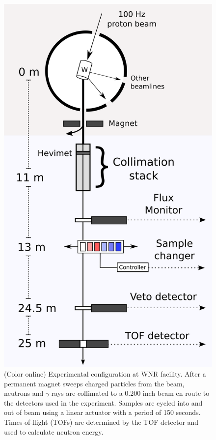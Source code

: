 \documentclass[twocolumn,secnumarabic,amssymb, nobibnotes, aps, prl,
superscriptaddress, nobalancelastpage]{revtex4}
\begin{document}
\begin{figure}
    \includegraphics[scale=0.6]{figures/ExperimentalSetup.png}
    \caption{(Color online) Experimental configuration at WNR facility. After a
        permanent magnet sweeps charged particles from the beam, neutrons and
        $\gamma$ rays are collimated to a 0.200 inch beam en route to the
        detectors used in the experiment. Samples are cycled into and out of beam
        using a linear actuator with a period of 150 seconds. Times-of-flight (TOFs) are
    determined by the TOF detector and used to calculate neutron energy.}
    \label{ExperimentalApparatus}
\end{figure}
\end{document}
